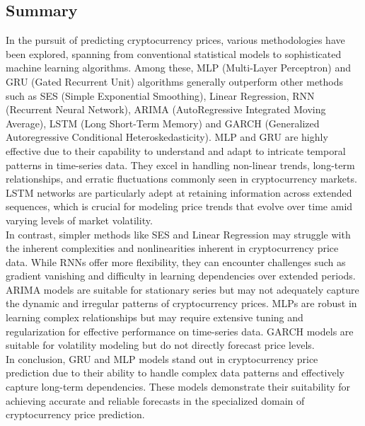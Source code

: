 \documentclass{ieeeojies}
\begin{document}
\subsection{Summary}
In the pursuit of predicting cryptocurrency prices, various methodologies have been explored, spanning from conventional statistical models to sophisticated machine learning algorithms. Among these, MLP (Multi-Layer Perceptron) and GRU (Gated Recurrent Unit) algorithms generally outperform other methods such as SES (Simple Exponential Smoothing), Linear Regression, RNN (Recurrent Neural Network), ARIMA (AutoRegressive Integrated Moving Average), LSTM (Long Short-Term Memory) and GARCH (Generalized Autoregressive Conditional Heteroskedasticity). MLP and GRU are highly effective due to their capability to understand and adapt to intricate temporal patterns in time-series data. They excel in handling non-linear trends, long-term relationships, and erratic fluctuations commonly seen in cryptocurrency markets. LSTM networks are particularly adept at retaining information across extended sequences, which is crucial for modeling price trends that evolve over time amid varying levels of market volatility. \\
In contrast, simpler methods like SES and Linear Regression may struggle with the inherent complexities and nonlinearities inherent in cryptocurrency price data. While RNNs offer more flexibility, they can encounter challenges such as gradient vanishing and difficulty in learning dependencies over extended periods. ARIMA models are suitable for stationary series but may not adequately capture the dynamic and irregular patterns of cryptocurrency prices. MLPs are robust in learning complex relationships but may require extensive tuning and regularization for effective performance on time-series data. GARCH models are suitable for volatility modeling but do not directly forecast price levels.\\
In conclusion, GRU and MLP models stand out in cryptocurrency price prediction due to their ability to handle complex data patterns and effectively capture long-term dependencies. These models demonstrate their suitability for achieving accurate and reliable forecasts in the specialized domain of cryptocurrency price prediction.
\vspace{-2mm}
\end{document}
